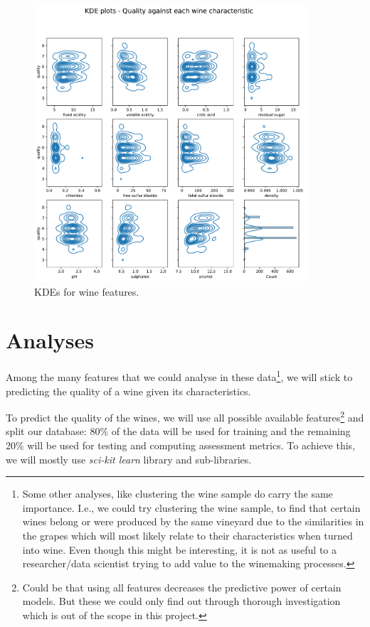 \documentclass[11pt]{article}
\begin{document}
\begin{figure}[h!]
    \centering
    \includegraphics[width=0.9\textwidth]{figs/wine_kde}
    \caption{KDEs for wine features.}
    \label{fig:wine_kdes}
\end{figure}


\section{Analyses}\label{sec:analyses}

Among the many features that we could analyse in these data\footnote{Some other analyses, like clustering the wine sample do
carry the same importance. I.e., we could try clustering the wine sample, to find that certain
wines belong or were produced by the same vineyard due to the similarities in the grapes which
will most likely relate to their characteristics when turned into wine.
Even though this might be interesting, it is not as useful to a researcher/data scientist trying to add value
to the winemaking processes.}, we will stick to predicting the quality
of a wine given its characteristics.

To predict the quality of the wines, we will use all possible available features\footnote{Could be that using all
features decreases the predictive power of certain models. But these we could only find out through thorough investigation
which is out of the scope in this project.} and split our database: 80\% of the data will be used for training and
the remaining 20\% will be used for testing and computing assessment metrics.
To achieve this, we will mostly use \emph{sci-kit learn} library and sub-libraries.
\end{document}
